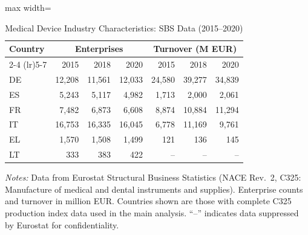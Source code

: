 \begin{table}[htbp]
\centering
\caption{Medical Device Industry Characteristics: SBS Data (2015--2020)}
\label{tab:sbs}
\begin{adjustbox}{max width=\textwidth}
\begin{tabular}{lrrrrrr}
\toprule
Country & \multicolumn{3}{c}{Enterprises} & \multicolumn{3}{c}{Turnover (M EUR)} \\
\cmidrule(lr){2-4} \cmidrule(lr){5-7}
 & 2015 & 2018 & 2020 & 2015 & 2018 & 2020 \\
\midrule
DE & 12,208 & 11,561 & 12,033 & 24,580 & 39,277 & 34,839 \\
ES & 5,243 & 5,117 & 4,982 & 1,713 & 2,000 & 2,061 \\
FR & 7,482 & 6,873 & 6,608 & 8,874 & 10,884 & 11,294 \\
IT & 16,753 & 16,335 & 16,045 & 6,778 & 11,169 & 9,761 \\
EL & 1,570 & 1,508 & 1,499 & 121 & 136 & 145 \\
LT & 333 & 383 & 422 & -- & -- & -- \\
\bottomrule
\end{tabular}
\end{adjustbox}
\parbox{\textwidth}{\footnotesize \textit{Notes:} Data from Eurostat Structural Business Statistics (NACE Rev.~2, C325: Manufacture of medical and dental instruments and supplies). Enterprise counts and turnover in million EUR. Countries shown are those with complete C325 production index data used in the main analysis. ``--'' indicates data suppressed by Eurostat for confidentiality.}
\end{table}
